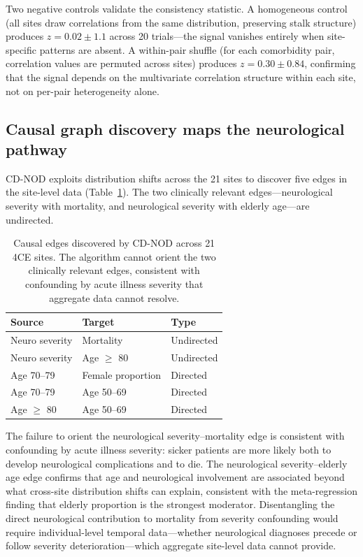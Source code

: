 \documentclass{article}
\begin{document}
Two negative controls validate the consistency statistic.
A homogeneous control (all sites draw correlations from the same distribution, preserving stalk structure) produces $z = 0.02 \pm 1.1$ across 20 trials---the signal vanishes entirely when site-specific patterns are absent.
A within-pair shuffle (for each comorbidity pair, correlation values are permuted across sites) produces $z = 0.30 \pm 0.84$, confirming that the signal depends on the multivariate correlation structure within each site, not on per-pair heterogeneity alone.


\subsection{Causal graph discovery maps the neurological pathway}

CD-NOD \cite{huang2020cdnod} exploits distribution shifts across the 21 sites to discover five edges in the site-level data (Table~\ref{tab:cdnod}).
The two clinically relevant edges---neurological severity with mortality, and neurological severity with elderly age---are undirected.

\begin{table}[t]
\centering
\caption{Causal edges discovered by CD-NOD across 21 4CE sites. The algorithm cannot orient the two clinically relevant edges, consistent with confounding by acute illness severity that aggregate data cannot resolve.}
\label{tab:cdnod}
\begin{tabular}{lll}
\toprule
Source & Target & Type \\
\midrule
Neuro severity & Mortality & Undirected \\
Neuro severity & Age $\geq$ 80 & Undirected \\
Age 70--79 & Female proportion & Directed \\
Age 70--79 & Age 50--69 & Directed \\
Age $\geq$ 80 & Age 50--69 & Directed \\
\bottomrule
\end{tabular}
\end{table}

The failure to orient the neurological severity--mortality edge is consistent with confounding by acute illness severity: sicker patients are more likely both to develop neurological complications and to die.
The neurological severity--elderly age edge confirms that age and neurological involvement are associated beyond what cross-site distribution shifts can explain, consistent with the meta-regression finding that elderly proportion is the strongest moderator.
Disentangling the direct neurological contribution to mortality from severity confounding would require individual-level temporal data---whether neurological diagnoses precede or follow severity deterioration---which aggregate site-level data cannot provide.
\end{document}
